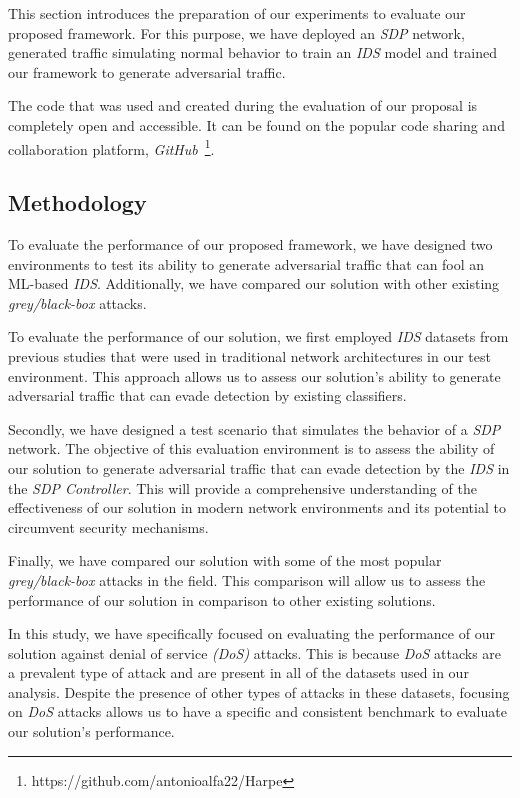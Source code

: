 This section introduces the preparation of our experiments to evaluate our proposed framework.
For this purpose, we have deployed an \textit{SDP} network, generated traffic simulating normal behavior to train an
\textit{IDS} model and trained our framework to generate adversarial traffic.

The code that was used and created during the evaluation of our proposal is completely open and accessible.
It can be found on the popular code sharing and collaboration platform,
\textit{GitHub}~\footnote{https://github.com/antonioalfa22/Harpe}.

\subsection{Methodology}\label{subsec:methodology}
To evaluate the performance of our proposed framework, we have designed two environments to test its ability to
generate adversarial traffic that can fool an ML-based \textit{IDS}.
Additionally, we have compared our solution with other existing \textit{grey/black-box} attacks.

To evaluate the performance of our solution, we first employed \textit{IDS} datasets from previous studies that were
used in traditional network architectures in our test environment.
This approach allows us to assess our solution's ability to generate adversarial traffic that can evade detection by
existing classifiers.

Secondly, we have designed a test scenario that simulates the behavior of a \textit{SDP} network.
The objective of this evaluation environment is to assess the ability of our solution to generate adversarial traffic
that can evade detection by the \textit{IDS} in the \textit{SDP Controller}.
This will provide a comprehensive understanding of the effectiveness of our solution in modern network environments
and its potential to circumvent security mechanisms.

Finally, we have compared our solution with some of the most popular \textit{grey/black-box} attacks in the field.
This comparison will allow us to assess the performance of our solution in comparison to other existing solutions.

In this study, we have specifically focused on evaluating the performance of our solution against denial of service
\textit{(DoS)} attacks.
This is because \textit{DoS} attacks are a prevalent type of attack and are present in all of the datasets used in our
analysis.
Despite the presence of other types of attacks in these datasets, focusing on \textit{DoS} attacks allows us to have a
specific and consistent benchmark to evaluate our solution's performance.

